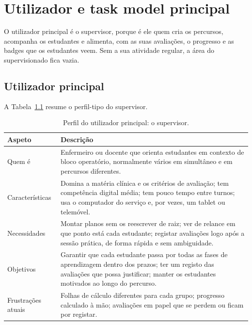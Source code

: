 \chapter{Utilizador e task model principal}
\label{cap:utilizador}

O utilizador principal é o supervisor, porque é ele quem cria os percursos, acompanha os estudantes e alimenta, com as suas avaliações, o progresso e as badges que os estudantes veem. Sem a sua atividade regular, a área do supervisionado fica vazia.

\section{Utilizador principal}

A Tabela~\ref{tab:utilizador} resume o perfil-tipo do supervisor.

\begin{table}[H]
    \centering
    \small
    \begin{tabularx}{\linewidth}{lX}
        \toprule
        \textbf{Aspeto} & \textbf{Descrição} \\
        \midrule
        Quem é & Enfermeiro ou docente que orienta estudantes em contexto de bloco operatório, normalmente vários em simultâneo e em percursos diferentes. \\
        \midrule
        Características & Domina a matéria clínica e os critérios de avaliação; tem competência digital média; tem pouco tempo entre turnos; usa o computador do serviço e, por vezes, um tablet ou telemóvel. \\
        \midrule
        Necessidades & Montar planos sem os reescrever de raiz; ver de relance em que ponto está cada estudante; registar avaliações logo após a sessão prática, de forma rápida e sem ambiguidade. \\
        \midrule
        Objetivos & Garantir que cada estudante passa por todas as fases de aprendizagem dentro dos prazos; ter um registo das avaliações que possa justificar; manter os estudantes motivados ao longo do percurso. \\
        \midrule
        Frustrações atuais & Folhas de cálculo diferentes para cada grupo; progresso calculado à mão; avaliações em papel que se perdem ou ficam por registar. \\
        \bottomrule
    \end{tabularx}
    \caption{Perfil do utilizador principal: o supervisor.}
    \label{tab:utilizador}
\end{table}


